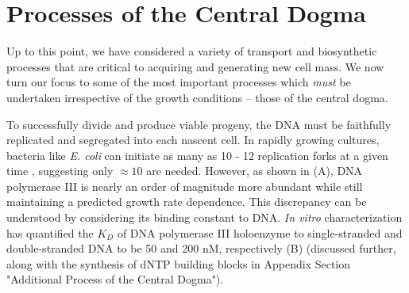 \section{Processes of the Central Dogma}
Up to this point, we have considered a variety of transport and biosynthetic
processes that are critical to acquiring and generating new cell mass. We now
turn our focus to some of the most important processes which \textit{must} be
undertaken irrespective of the growth conditions -- those of the central dogma.

To successfully divide and produce viable progeny, the DNA must be
faithfully replicated and segregated into each nascent cell.
In rapidly growing cultures, bacteria like \textit{E. coli} can initiate as many
as 10 - 12 replication forks at a given time \citep{bremer2008, si2017},
suggesting  only $\approx 10$ are needed. However, as shown in
(A), DNA polymerase III is nearly an order of magnitude more
abundant while still maintaining a predicted growth rate dependence. This
discrepancy can be understood by considering its binding constant to DNA.
\textit{In vitro} characterization has quantified the $K_D$ of DNA polymerase
III holoenzyme to single-stranded and double-stranded DNA to be 50 and 200 nM,
respectively \citep{ason2000} (B) (discussed further,
along with the synthesis of dNTP building blocks in Appendix Section "Additional Process of
the Central Dogma").

